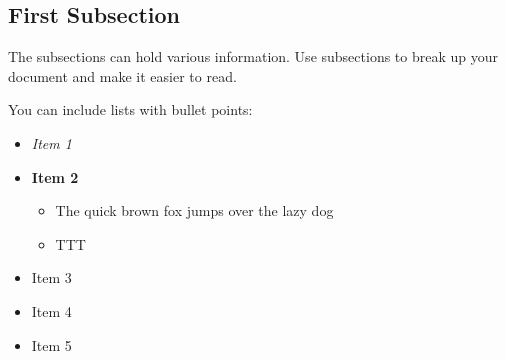 \documentclass[twocolumn]{article}
\begin{document}
\subsection{First Subsection}
\label{sec:org4db8dbe}

The subsections can hold various information.
Use subsections to break up your document and make it easier to read.

You can include lists with bullet points:
\begin{itemize}
\item \emph{Item 1}
\item \textbf{Item 2}
\begin{itemize}
\item The quick brown fox jumps over the lazy dog
\item TTT
\end{itemize}
\item Item 3
\item Item 4
\item Item 5
\end{itemize}
\end{document}
